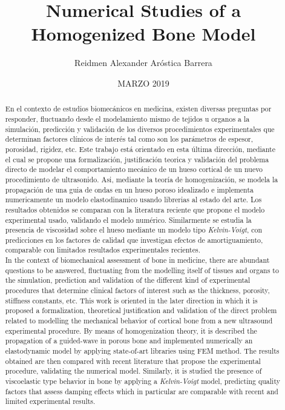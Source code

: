 \documentclass[upright, contnum]{umemoria}
\author{Reidmen Alexander Aróstica Barrera}
\title{Numerical Studies of a Homogenized Bone Model}
\date{MARZO 2019}
\begin{document}
\frontmatter
\maketitle

\begin{abstract}
En el contexto de estudios biomecánicos en medicina, existen diversas preguntas por responder, fluctuando desde el modelamiento mismo de tejidos u organos a la simulación, predicción y validación de los diversos procedimientos experimentales que determinan factores clínicos de interés tal como son los parámetros de espesor, porosidad, rigidez, etc. Este trabajo está orientado en esta última dirección, mediante el cual se propone una formalización, justificación teorica y validación del problema directo de modelar el comportamiento mecánico de un hueso cortical de un nuevo procedimiento de ultrasonido. Asi, mediante la teoría de homogenización, se modela la propagación de una guia de ondas en un hueso poroso idealizado e implementa numericamente un modelo elastodinamico usando librerias al estado del arte. Los resultados obtenidos se comparan con la literatura reciente que propone el modelo experimental usado, validando el modelo numérico. Similarmente se estudia la presencia de viscosidad sobre el hueso mediante un modelo tipo \textit{Kelvin-Voigt}, con predicciones en los factores de calidad que investigan efectos de amortiguamiento, comparable con limitados resultados experimentales recientes. \\

In the context of biomechanical assessment of bone in medicine, there are abundant questions to be answered, fluctuating from the modelling itself of tissues and organs to the simulation, prediction and validation of the different kind of experimental procedures that determine clinical factors of interest such as the thickness, porosity, stiffness constants, etc. This work is oriented in the later direction in which it is proposed a formalization, theoretical justification and validation of the direct problem related to modelling the mechanical behavior of cortical bone from a new ultrasound experimental procedure. By means of homogenization theory, it is described the propagation of a guided-wave in porous bone and implemented numerically an elastodynamic model by applying state-of-art libraries using FEM method. The results obtained are then compared with recent literature that propose the experimental procedure, validating the numerical model. Similarly, it is studied the presence of viscoelastic type behavior in bone by applying a \textit{Kelvin-Voigt} model, predicting quality factors that assess damping effects which in particular are comparable with recent and limited experimental results.
\end{abstract}
\end{document}
